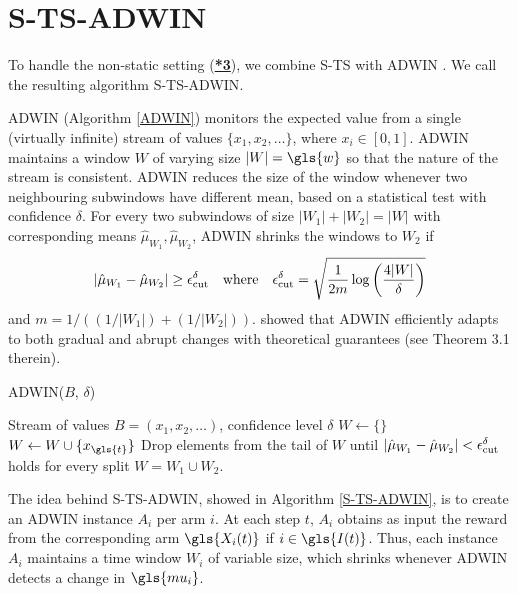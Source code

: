 \section{\acrlong{S-TS-ADWIN}}
\label{non-static-adaptation}

To handle the non-static setting (\hyperlink{*3}{\textbf{*3}}), we combine  \gls{S-TS} with \gls{ADWIN} \cite{DBLP:conf/sdm/BifetG07}. We call the resulting algorithm \gls{S-TS-ADWIN}.

\gls{ADWIN} (Algorithm \ref{ADWIN}) monitors the expected value from a single (virtually infinite) stream of values $\{x_1,x_2,\dots\}$, where $x_i \in [0,1]$. 
\gls{ADWIN} maintains a window $W$ of varying size $|W| = \gls{w}$ so that the nature of the stream is consistent. \gls{ADWIN} reduces the size of the window whenever two neighbouring subwindows have different mean, based on a statistical test with %
confidence $\delta$. %
For every two subwindows of size $|W_1| + |W_2| = |W|$ with corresponding means $\hat{\mu}_{W_1},\hat{\mu}_{W_2}$, \gls{ADWIN} shrinks the windows to $W_2$ if 
\begin{equation}
 |\hat{\mu}_{W_1} - \hat{\mu}_{W_2}| \ge \epsilon_\mathrm{cut}^\delta \quad \mathrm{where} \quad \epsilon_\mathrm{cut}^\delta = \sqrt{\frac{1}{2 m} \log\left(\frac{4 |W|}{\delta}\right)}
\end{equation}
and $m = 1/((1/|W_1|)+(1/|W_2|))$. %
\cite{DBLP:conf/sdm/BifetG07} showed that \gls{ADWIN} efficiently adapts to both gradual and abrupt changes with theoretical guarantees %
(see Theorem 3.1 therein).

\begin{algorithm}
	\footnotesize
	\caption{\gls{ADWIN}($B$, $\delta$)}\label{ADWIN} 
	\begin{algorithmic}[1]
		\Require Stream of values $B = (x_{1}, x_{2}, \dots)$, confidence level $\delta$ 
		\State $W \leftarrow \{\}$
		\State $W \leftarrow W \cup \{x_{\gls{t}}\}$
		\State Drop elements from the tail of $W$ until $|\hat{\mu}_{W_1} - \hat{\mu}_{W_2}| < \epsilon_\mathrm{cut}^\delta$ holds for every split $W = W_1 \cup W_2$. 
		\EndFor
	\end{algorithmic}
\end{algorithm}

The idea behind \gls{S-TS-ADWIN}, showed in Algorithm \ref{S-TS-ADWIN}, is to create an \gls{ADWIN}  instance $A_i$ per arm $i$.
At each step $t$, $A_i$ obtains as input the reward from the corresponding arm $\gls{X_i(t)}$ if $i \in \gls{I(t)}$. 
Thus, each instance $A_i$ maintains a time window $W_i$ of variable size, which shrinks whenever \gls{ADWIN} detects a change in $\gls{mu_i}$.  

